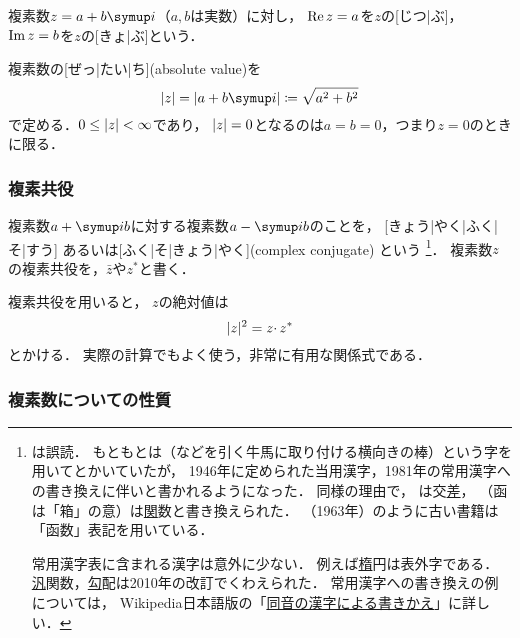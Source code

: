 \documentclass[../sotsu.tex]{subfiles}
\begin{document}
複素数$z = a + b\iu$（$a, b$は実数）に対し，
$\operatorname{Re} z = a$を$z$の[じつ|ぶ]，
$\operatorname{Im} z = b$を$z$の[きょ|ぶ]という．

複素数の[ぜっ|たい|ち](absolute value)を
\begin{equation}
    \label{eq:complex-number-abs}
    \abs{z} 
        = \abs{a + b\iu}
        \coloneq \sqrt{a^2 + b^2}
\end{equation}
で定める．$0 \leq \lvert z\rvert < \infty$であり，
$\lvert z\rvert = 0$となるのは$a = b = 0$，つまり$z = 0$のときに限る．



\subsubsection*{複素共役}

複素数$a + \iu b$に対する複素数$a - \iu b$のことを，
[きょう|やく|ふく|そ|すう]%
%
あるいは[ふく|そ|きょう|やく](complex conjugate)%
%
という%
\footnote{\label{footnote:joyo-kanji}
    は誤読．
    もともとは（などを引く牛馬に取り付ける横向きの棒）という字を用いてとかいていたが，
    1946年に定められた当用漢字，1981年の常用漢字への書き換えに伴いと書かれるようになった．
    同様の理由で，
    は交\underline{差}，
    （函は「箱」の意）は\underline{関}数と書き換えられた．
    \cite{ito-lebesgue-1963}（1963年）のように古い書籍は「函数」表記を用いている．
    
    常用漢字表に含まれる漢字は意外に少ない．
    例えば\underline{楕}円は表外字である．
    \underline{汎}関数，\underline{勾}配は2010年の改訂でくわえられた．
    常用漢字への書き換えの例については，
    Wikipedia日本語版の「\href{https://ja.wikipedia.org/wiki/同音の漢字による書きかえ}{同音の漢字による書きかえ}」に詳しい．
}．
複素数$z$の複素共役を，$\bar{z}$や$z^*$と書く．

複素共役を用いると，
$z$の絶対値は
\begin{equation}
    \abs{z}^2 = z \cdotp \conj{z}
\end{equation}
とかける．
実際の計算でもよく使う，非常に有用な関係式である．




\subsubsection*{複素数についての性質}
\end{document}
